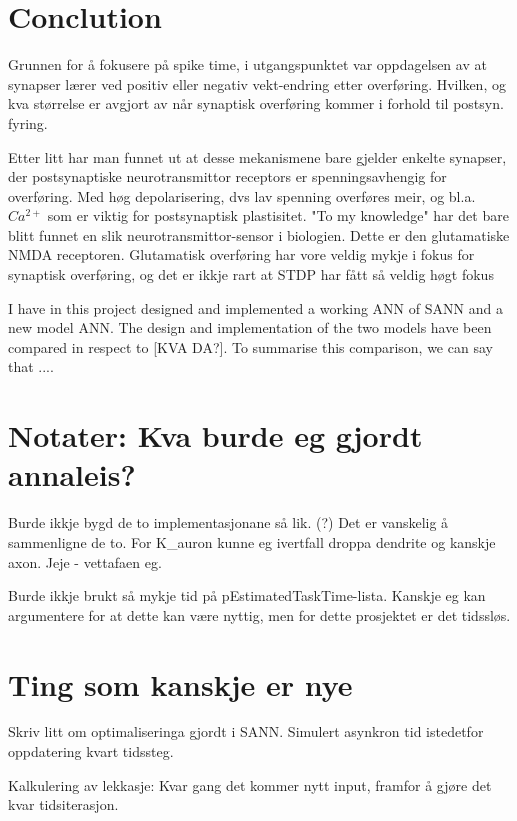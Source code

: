 

\section{Conclution}
Grunnen for å fokusere på spike time, i utgangspunktet var oppdagelsen av at synapser lærer ved positiv eller negativ vekt-endring etter overføring. 
Hvilken, og kva størrelse er avgjort av når synaptisk overføring kommer i forhold til postsyn. fyring.

Etter litt har man funnet ut at desse mekanismene bare gjelder enkelte synapser, der postsynaptiske neurotransmittor receptors er spenningsavhengig for overføring. 
Med høg depolarisering, dvs lav spenning overføres meir, og bl.a. $Ca^{2+}$ som er viktig for postsynaptisk plastisitet.
"To my knowledge" har det bare blitt funnet en slik neurotransmittor-sensor i biologien. Dette er den glutamatiske NMDA receptoren.
Glutamatisk overføring har vore veldig mykje i fokus for synaptisk overføring, og det er ikkje rart at STDP har fått så veldig høgt fokus %


I have in this project designed and implemented a working ANN of SANN and a new model ANN.
The design and implementation of the two models have been compared in respect to [KVA DA?].
To summarise this comparison, we can say that ....

\section{Notater: Kva burde eg gjordt annaleis?}
Burde ikkje bygd de to implementasjonane så lik. (?)
Det er vanskelig å sammenligne de to. For K\_auron kunne eg ivertfall droppa dendrite og kanskje axon.
Jeje - vettafaen eg.

Burde ikkje brukt så mykje tid på pEstimatedTaskTime-lista. Kanskje eg kan argumentere for at dette kan være nyttig, men for dette prosjektet er det tidssløs.


\section{Ting som kanskje er nye}
Skriv litt om optimaliseringa gjordt i SANN. Simulert asynkron tid istedetfor oppdatering kvart tidssteg.

Kalkulering av lekkasje: Kvar gang det kommer nytt input, framfor å gjøre det kvar tidsiterasjon.

